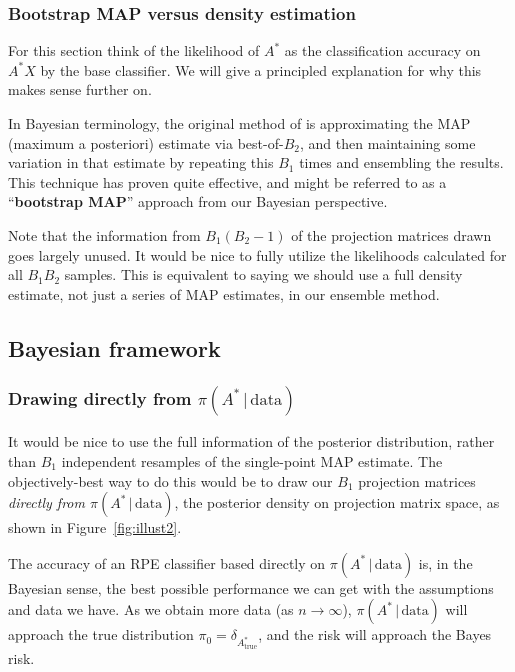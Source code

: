 \documentclass[ejs,preprint]{imsart}
\begin{document}
\subsubsection{Bootstrap MAP versus density estimation}

For this section think of the likelihood of $A^*$ as the classification accuracy on $A^*X$ by the base classifier. We will give a principled explanation for why this makes sense further on.

In Bayesian terminology, the original method of \cite{CS15} is approximating the MAP (maximum a posteriori) estimate via best-of-$B_2$, and then maintaining some variation in that estimate by repeating this $B_1$ times and ensembling the results. This technique has proven quite effective, and might be referred to as a ``\textbf{bootstrap MAP}'' approach from our Bayesian perspective.

Note that the information from $B_1(B_2-1)$ of the projection matrices drawn goes largely unused. It would be nice to fully utilize the likelihoods calculated for all $B_1B_2$ samples. This is equivalent to saying we should use a full density estimate, not just a series of MAP estimates, in our ensemble method.

\subsection{Bayesian framework}

\subsubsection{Drawing directly from $\pi(A^*\,|\,\mathrm{data})$}

It would be nice to use the full information of the posterior distribution, rather than $B_1$ independent resamples of the single-point MAP estimate. The objectively-best way to do this would be to draw our $B_1$ projection matrices \emph{directly from $\pi(A^*\,|\,\mathrm{data})$}, the posterior density on projection matrix space, as shown in Figure~\ref{fig:illust2}.

The accuracy of an RPE classifier based directly on $\pi(A^*\,|\,\mathrm{data})$ is, in the Bayesian sense, the best possible performance we can get with the assumptions and data we have. As we obtain more data (as $n\to\infty$), $\pi(A^*\,|\,\mathrm{data})$ will approach the true distribution $\pi_0 = \delta_{A^*_\mathrm{true}}$, and the risk will approach the Bayes risk.
\end{document}
